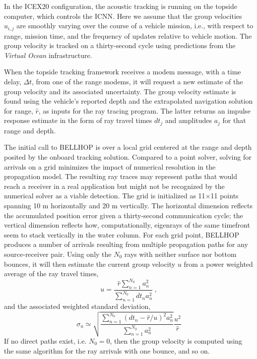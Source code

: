  In the ICEX20 configuration, the acoustic tracking is running on the topside computer, which controls the ICNN.
Here we assume that the group velocities $u_{i,j}$ are smoothly varying over the course of a vehicle mission, i.e., with respect to range, mission time, and the frequency of updates relative to vehicle motion. 
The group velocity is tracked on a thirty-second cycle using predictions from the \textit{Virtual Ocean} infrastructure.

 When the topside tracking framework receives a modem message, with a time delay, $\Delta t$, from one of the range modems, it will request a new estimate of the group velocity and its associated uncertainty.
The group velocity estimate is found using the vehicle's reported depth and the extrapolated navigation solution for range, $\hat{r}$, as inputs for the ray tracing program.
The latter returns an impulse response estimate in the form of ray travel times $dt_{j}$ and amplitudes $a_{j}$ for that range and depth.

 The initial call to BELLHOP is over a local grid centered at the range and depth posited by the onboard tracking solution.
Compared to a point solver, solving for arrivals on a grid minimizes the impact of numerical resolution in the propagation model.
The resulting ray traces may represent paths that would reach a receiver in a real application but might not be recognized by the numerical solver as a viable detection.
The grid is initialized as 11$\times$11 points spanning 10 m horizontally and 20 m vertically.
The horizontal dimension reflects the accumulated position error given a thirty-second communication cycle; the vertical dimension reflects how, computationally, eigenrays of the same timefront seem to stack vertically in the water column. 
For each grid point, BELLHOP produces a number of arrivals resulting from multiple propagation paths for any source-receiver pair.
Using only the $N_0$ rays with neither surface nor bottom bounces, it will then estimate the current group velocity $u$ from a power weighted average of the ray travel times,
\begin{equation}
u = \frac{\hat{r} \sum_{n=1}^{N_{0}} a_{n}^{2}}{\sum_{n=1}^{N_{0}} dt_{n}a_{n}^{2}} ~, 
\end{equation}
and the associated weighted standard deviation,
\begin{equation}
\sigma_{u} \simeq \sqrt{\frac {\sum_{n=1}^{N_{0}} (dt_{n}-\hat{r}/u)^{2}a_{n}^{2}}{ \sum_{n=1}^{N_{0}} a_{n}^{2}} } \frac{u^{2}}{\hat{r}}
\end{equation}
If no direct paths exist, i.e. $N_{0}=0$, then the group velocity is computed using the same algorithm for the ray arrivals with one bounce, and so on.

